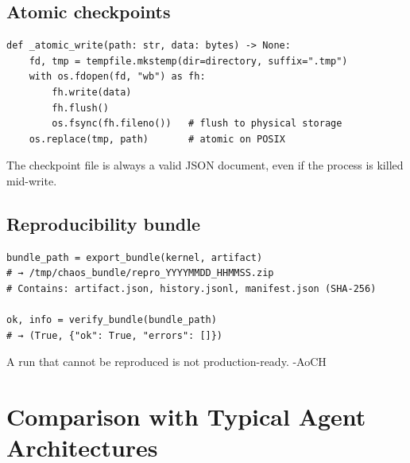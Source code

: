 \documentclass[11pt, a4paper]{article}
\begin{document}
\subsection{Atomic checkpoints}


\begin{lstlisting}[caption={Atomic write — safe on crash}]
def _atomic_write(path: str, data: bytes) -> None:
    fd, tmp = tempfile.mkstemp(dir=directory, suffix=".tmp")
    with os.fdopen(fd, "wb") as fh:
        fh.write(data)
        fh.flush()
        os.fsync(fh.fileno())   # flush to physical storage
    os.replace(tmp, path)       # atomic on POSIX
\end{lstlisting}

The checkpoint file is always a valid JSON document, even if the process is
killed mid-write.

\subsection{Reproducibility bundle}


\begin{lstlisting}[caption={Export and verify a run bundle}]
bundle_path = export_bundle(kernel, artifact)
# → /tmp/chaos_bundle/repro_YYYYMMDD_HHMMSS.zip
# Contains: artifact.json, history.jsonl, manifest.json (SHA-256)

ok, info = verify_bundle(bundle_path)
# → (True, {"ok": True, "errors": []})
\end{lstlisting}

A run that cannot be reproduced is not production-ready. -AoCH

\section{Comparison with Typical Agent Architectures}
\end{document}
